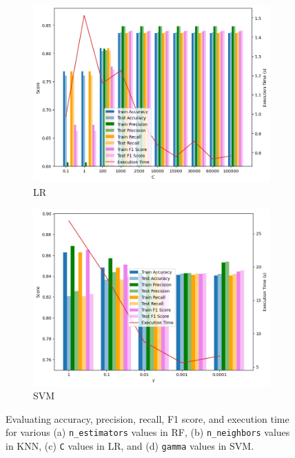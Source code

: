 \documentclass[conference]{IEEEtran}
\begin{document}
\begin{figure}[!t]
    \begin{subfigure}[b]{0.49\columnwidth}
        \includegraphics[width=\textwidth]{lr_c.png}
        \caption{LR}\label{fig:lr}
    \end{subfigure}
    \hfill
    \begin{subfigure}[b]{0.49\columnwidth}
        \includegraphics[width=\textwidth]{svm_gamma.png}
        \caption{SVM}\label{fig:svm}
    \end{subfigure}
    \caption{Evaluating accuracy, precision, recall, F1 score, and execution time for various (a) \texttt{\footnotesize n\_estimators} values in RF, (b) \texttt{\footnotesize n\_neighbors} values in KNN, (c) \texttt{\footnotesize C} values in LR, and (d) \texttt{\footnotesize gamma} values in SVM.}
    \label{fig:rf_knn_lr_svm_hyperparameters}
    \vspace{-5mm}
\end{figure}
\end{document}

